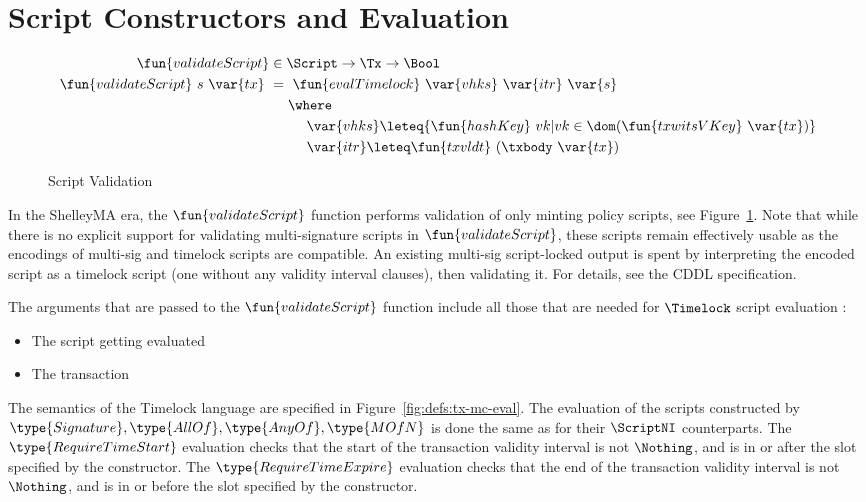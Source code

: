 \section{Script Constructors and Evaluation}
\label{sec:timelock-lang}


\begin{figure}[htb]
  \begin{align*}
    \fun{validateScript} & \in\Script\to\Tx\to\Bool \\
    \fun{validateScript} ~s~\var{tx}~& =~
                             \fun{evalTimelock}~\var{vhks} ~\var{itr}~\var{s} \\
                         & ~~~~\where \\
                         & ~~~~~~~~\var{vhks}\leteq \{\fun{hashKey}~vk \vert
                           vk \in \dom(\fun{txwitsVKey}~\var{tx})\} \\
                         & ~~~~~~~~\var{itr} \leteq \fun{txvldt}~ (\txbody~ \var{tx})
  \end{align*}
  \caption{Script Validation}
  \label{fig:functions-validate}
\end{figure}

In the ShelleyMA era, the
$\fun{validateScript}$ function performs validation of only minting policy scripts,
see Figure~\ref{fig:functions-validate}. Note that while there is no explicit
support for validating multi-signature scripts in $\fun{validateScript}$,
these scripts remain effectively usable as the encodings of multi-sig and timelock
scripts are compatible. An existing multi-sig script-locked output is
spent by interpreting the encoded script as a timelock script (one without
any validity interval clauses), then validating it. For details, see the CDDL
specification.

The arguments that are passed to the $\fun{validateScript}$ function include all those
that are needed for $\Timelock$ script evaluation :

\begin{itemize}
\item The script getting evaluated
\item The transaction
\end{itemize}

The semantics of the Timelock language are specified in Figure~\ref{fig:defs:tx-mc-eval}.
The evaluation of the scripts constructed by $\type{Signature}, \type{AllOf},
\type{AnyOf}, \type{MOfN}$ is done the same as for their
$\ScriptNI$ counterparts. The $\type{RequireTimeStart}$ evaluation
checks that the start of the transaction validity interval is not $\Nothing$, and is in or after
the slot specified by the constructor. The $\type{RequireTimeExpire}$ evaluation
checks that the end of the transaction validity interval is not $\Nothing$, and is in or before
the slot specified by the constructor.


